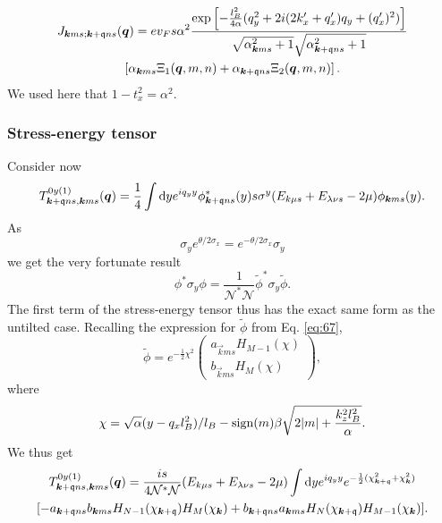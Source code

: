 \begin{multline}
  J_{\bm{k} m s; \bm{k} + \mathfrak{q} n s} (\bm{q}) =
  e v_F s \alpha^2
  \frac{
    \exp \left[
      -\frac{l_{B}^2}{4 \alpha } (q_{y}^2 + 2i (2 k' _x + q' _x) q_{y} + (q'_x)^2 )
    \right]
  }{
    \sqrt{\alpha_{\bm{k} m s}^2 + 1} \sqrt{\alpha _{\bm{k}+\mathfrak{q} n s}^2 + 1}
  }\\
  \left[
     \alpha_{\bm{k} m s} \Xi_1(\bm{q}, m, n) + \alpha_{\bm{k} + \mathfrak{q} n s} \Xi_2(\bm{q}, m, n)
  \right].
\end{multline}
We used here that \( 1 - t_x^2 = \alpha^2 \).

\subsubsection{Stress-energy tensor}
Consider now
\begin{equation}
  \label{eq:77}
  T_{\bm{k} + \mathfrak{q} n s, \bm{k} m s}^{0y(1)} (\bm{q}) =
  \frac{1}{4}
  \int \mathrm{d} y
  e^{i q_{y} y}
  \phi ^{*}_{\bm{k} + \mathfrak{q} n s}(y) s \sigma ^{y}
  (E_{k \mu  s} + E_{\lambda \nu s} - 2 \mu)
  \phi _{\bm{k} m s} (y).
\end{equation}
As
\begin{equation}
  \label{eq:78}
  \sigma _{y} e^{\theta /2 \sigma _{x}} = e^{-\theta /2 \sigma _{x}} \sigma _{y}
\end{equation}
we get the very fortunate result
\begin{equation}
  \label{eq:79}
  \phi^{*} \sigma _{y} \phi = \frac{1}{\mathcal{N}^{*} \mathcal{N}} \tilde{\phi}^{*} \sigma _{y} \tilde{\phi}.
\end{equation}
The first term of the stress-energy tensor thus has the exact same form as the untilted case.
Recalling the expression for \(\tilde{\phi}\) from Eq. \eqref{eq:67},
\[
  \tilde{\phi} = e^{-\frac{1}{2} \chi ^2}
  \begin{pmatrix}
    a_{\vec{k} m s} H_{M-1} (\chi)\\
    b_{\vec{k} m s} H_{M} (\chi)
  \end{pmatrix},
\]
where
\[
\chi = \sqrt{\alpha} (y - q_{x} l_{B}^2 ) /l_{B} - \operatorname{sign}(m) \beta \sqrt{2 |m| + \frac{k_{z}^2 l_{B}^2}{\alpha }}.
\]
We thus get
\begin{multline}
  \label{eq:80}
  T_{\vec{k}+\qvec{q} ns, \vec{k} m s}^{0y (1)} (\vec{q}) =
  \frac{is}{4 \mathcal{N}^{*}\mathcal{N}} (E_{k\mu  s} + E_{\lambda \nu s} - 2 \mu)
  \int \mathrm{d} y
  e^{i q_{y} y}
  e^{-\frac{1}{2} (\chi_{\vec{k}+\qvec{q}}^2 + \chi_{\vec{k}} ^2) }\\
  [
  -a_{\vec{k} + \qvec{q} ns} b_{\vec{k} m s} H_{N-1} (\chi_{\vec{k} + \qvec{q}}) H_{M} (\chi_{\vec{k}})
  + b_{\vec{k} + \qvec{q} n s} a_{\vec{k} ms} H_{N}(\chi_{\vec{k} + \qvec{q}}) H_{M-1} (\chi_{\vec{k}})
  ].
\end{multline}
